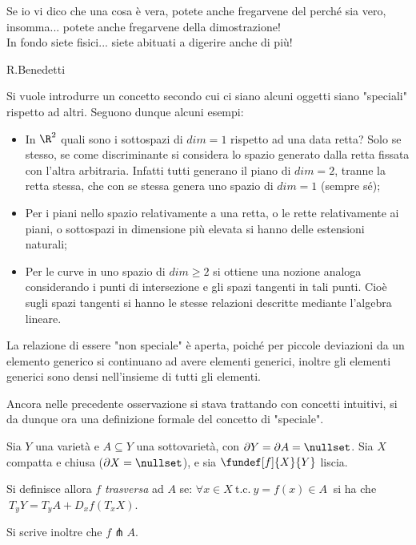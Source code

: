 
\epigraph{Se io vi dico che una cosa è vera, potete anche fregarvene del perché sia vero, insomma... potete anche fregarvene della dimostrazione!\\ In fondo siete fisici... siete abituati a digerire anche di più!}{R.Benedetti}

Si vuole introdurre un concetto secondo cui ci siano alcuni oggetti siano "speciali" rispetto ad altri. Seguono dunque alcuni esempi:

\begin{es}
\begin{itemize}
\item In $\R^2$ quali sono i sottospazi di $dim = 1$ rispetto ad una data retta? Solo se stesso, se come discriminante si considera lo spazio generato dalla retta fissata con l'altra arbitraria. Infatti tutti generano il piano di $dim = 2$, tranne la retta stessa, che con se stessa genera uno spazio di $dim = 1$ (sempre sé);
\item Per i piani nello spazio relativamente a una retta, o le rette relativamente ai piani, o sottospazi in dimensione più elevata si hanno delle estensioni naturali;
\item Per le curve in uno spazio di $dim \geq 2$ si ottiene una nozione analoga considerando i punti di intersezione e gli spazi tangenti in tali punti. Cioè sugli spazi tangenti si hanno le stesse relazioni descritte mediante l'algebra lineare.
\end{itemize}
\end{es}

\begin{oss}
La relazione di essere "non speciale" è aperta, poiché per piccole deviazioni da un elemento generico si continuano ad avere elementi generici, inoltre gli elementi generici sono densi nell'insieme di tutti gli elementi.
\end{oss}

Ancora nelle precedente osservazione si stava trattando con concetti intuitivi, si da dunque ora una definizione formale del concetto di "speciale".

\begin{defn}[Trasversalità]
Sia $Y$ una varietà e $A\subseteq Y$ una sottovarietà, con $\partial Y = \partial A = \nullset$. Sia $X$ compatta e chiusa ($\partial X = \nullset$), e sia $\fundef[f]{X}{Y}$ liscia.

Si definisce allora $f$ \emph{trasversa} ad $A$ se: $\forall x \in X~$t.c.$~y = f(x) \in A~$ si ha che $~T_yY = T_yA + D_xf(T_xX)$.

Si scrive inoltre che $f \pitchfork A$.
\end{defn}

